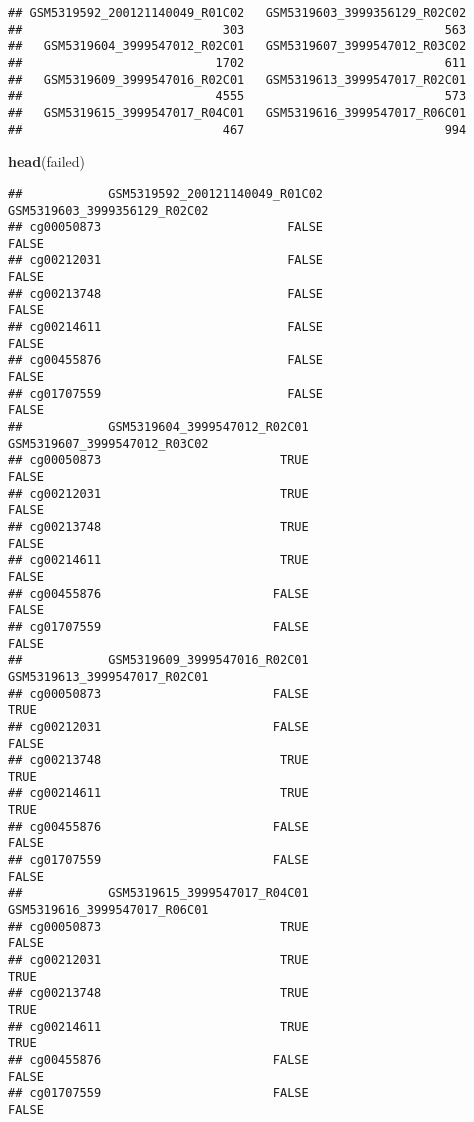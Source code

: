 \documentclass[
]{article}
\newenvironment{Shaded}{\begin{snugshade}}{\end{snugshade}}
\newcommand{\FunctionTok}[1]{\textcolor[rgb]{0.13,0.29,0.53}{\textbf{#1}}}
\newcommand{\NormalTok}[1]{#1}
\begin{document}
\begin{verbatim}
## GSM5319592_200121140049_R01C02   GSM5319603_3999356129_R02C02 
##                            303                            563 
##   GSM5319604_3999547012_R02C01   GSM5319607_3999547012_R03C02 
##                           1702                            611 
##   GSM5319609_3999547016_R02C01   GSM5319613_3999547017_R02C01 
##                           4555                            573 
##   GSM5319615_3999547017_R04C01   GSM5319616_3999547017_R06C01 
##                            467                            994
\end{verbatim}

\begin{Shaded}
\begin{Highlighting}[]
\FunctionTok{head}\NormalTok{(failed)}
\end{Highlighting}
\end{Shaded}

\begin{verbatim}
##            GSM5319592_200121140049_R01C02 GSM5319603_3999356129_R02C02
## cg00050873                          FALSE                        FALSE
## cg00212031                          FALSE                        FALSE
## cg00213748                          FALSE                        FALSE
## cg00214611                          FALSE                        FALSE
## cg00455876                          FALSE                        FALSE
## cg01707559                          FALSE                        FALSE
##            GSM5319604_3999547012_R02C01 GSM5319607_3999547012_R03C02
## cg00050873                         TRUE                        FALSE
## cg00212031                         TRUE                        FALSE
## cg00213748                         TRUE                        FALSE
## cg00214611                         TRUE                        FALSE
## cg00455876                        FALSE                        FALSE
## cg01707559                        FALSE                        FALSE
##            GSM5319609_3999547016_R02C01 GSM5319613_3999547017_R02C01
## cg00050873                        FALSE                         TRUE
## cg00212031                        FALSE                        FALSE
## cg00213748                         TRUE                         TRUE
## cg00214611                         TRUE                         TRUE
## cg00455876                        FALSE                        FALSE
## cg01707559                        FALSE                        FALSE
##            GSM5319615_3999547017_R04C01 GSM5319616_3999547017_R06C01
## cg00050873                         TRUE                        FALSE
## cg00212031                         TRUE                         TRUE
## cg00213748                         TRUE                         TRUE
## cg00214611                         TRUE                         TRUE
## cg00455876                        FALSE                        FALSE
## cg01707559                        FALSE                        FALSE
\end{verbatim}
\end{document}
